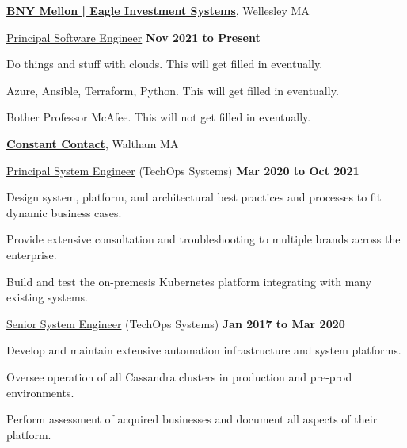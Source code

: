\documentclass[10pt]{article}
\renewcommand\textit[1]{\underline{#1}}
\newcommand{\halfblankline}{\quad\vspace{-0.5\baselineskip}\pagebreak[3]}
\begin{document}
\href{https://www.bnymellon.com/us/en/solutions/asset-managers/data-analytics.html}{\textbf{BNY Mellon | Eagle Investment Systems}},
Wellesley MA
\begin{outerlist}
	\item[] \textit{Principal Software Engineer}
        \hfill \textbf{Nov 2021 to Present}
	\begin{innerlist}
		\item Do things and stuff with clouds. This will get filled in eventually.
		\item Azure, Ansible, Terraform, Python. This will get filled in eventually.
		\item Bother Professor McAfee. This will not get filled in eventually.
        \end{innerlist}
\end{outerlist}
\halfblankline

\href{https://www.constantcontact.com/}{\textbf{Constant Contact}},
Waltham MA
\begin{outerlist}
	\item[] \textit{Principal System Engineer} (TechOps Systems)
        \hfill \textbf{Mar 2020 to Oct 2021}
	\begin{innerlist}
		\item Design system, platform, and architectural best practices and processes to fit dynamic business cases.
		\item Provide extensive consultation and troubleshooting to multiple brands across the enterprise.
		\item Build and test the on-premesis Kubernetes platform integrating with many existing systems.
        \end{innerlist}

	\item[] \textit{Senior System Engineer} (TechOps Systems)
        \hfill \textbf{Jan 2017 to Mar 2020}
	\begin{innerlist}
		\item Develop and maintain extensive automation infrastructure and system platforms.
		\item Oversee operation of all Cassandra clusters in production and pre-prod environments.
		\item Perform assessment of acquired businesses and document all aspects of their platform.
        \end{innerlist}
\end{outerlist}
\halfblankline
\end{document}
